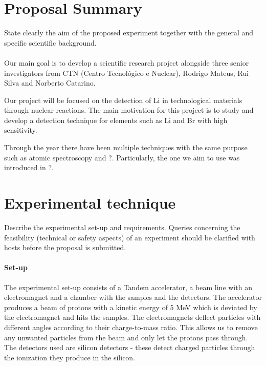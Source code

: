 \documentclass{article}
\begin{document}
\begin{multicols}{2}


\section{Proposal Summary}

State clearly the aim of the proposed experiment together with the general and specific scientific background.

\paragraph*{}

Our main goal is to develop a scientific research project alongside three senior investigators from CTN (Centro Tecnológico e Nuclear), Rodrigo Mateus, Rui Silva and Norberto Catarino. 

Our project will be focused on the detection of Li in technological materials through nuclear reactions. The main motivation for this project is to study and develop a detection technique for elements such as Li and Br with high sensitivity.

Through the year there have been multiple techniques with the same purpose such as atomic spectroscopy and ?. Particularly, the one we aim to use was introduced in ?.

\section{Experimental technique}

Describe the experimental set-up and requirements. Queries concerning the feasibility (technical or safety aspects) of an experiment should be clarified with hosts before the proposal is submitted.

\paragraph{Set-up}

The experimental set-up consists of a Tandem accelerator, a beam line with an electromagnet and a chamber with the samples and the detectors.
The accelerator produces a beam of protons with a kinetic energy of 5 MeV which is deviated by the electromagnet and hits the samples. 
The electromagnets deflect particles with different angles according to their charge-to-mass ratio.
This allows us to remove any unwanted particles from the beam and only let the protons pass through.
The detectors used are silicon detectors - these detect charged particles through the ionization they produce in the silicon.


\end{multicols}
\end{document}
